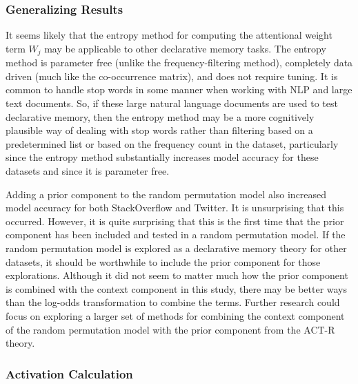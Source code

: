 \documentclass[man,floatsintext,donotrepeattitle]{apa6}
\begin{document}
\subsubsection{Generalizing Results}

It seems likely that the entropy method for computing the attentional weight term $W_{j}$ may be applicable to other declarative memory tasks.
The entropy method is parameter free (unlike the frequency-filtering method), completely data driven (much like the co-occurrence matrix), and does not require tuning.
It is common to handle stop words in some manner when working with NLP and large text documents.
So, if these large natural language documents are used to test declarative memory, then the entropy method may be a more cognitively plausible way of dealing with stop words rather than 
filtering based on a predetermined list or based on the frequency count in the dataset, particularly since the entropy method substantially increases model accuracy for these datasets and since it is parameter free.

Adding a prior component to the random permutation model also increased model accuracy for both StackOverflow and Twitter.
It is unsurprising that this occurred.
However, it is quite surprising that this is the first time that the prior component has been included and tested in a random permutation model.
If the random permutation model is explored as a declarative memory theory for other datasets, it should be worthwhile to include the prior component for those explorations.
Although it did not seem to matter much how the prior component is combined with the context component in this study, 
there may be better ways than the log-odds transformation to combine the terms.
Further research could focus on exploring a larger set of methods for combining the context component of the random permutation model with the prior component from the ACT-R theory.

\subsubsection{Activation Calculation}
\end{document}
